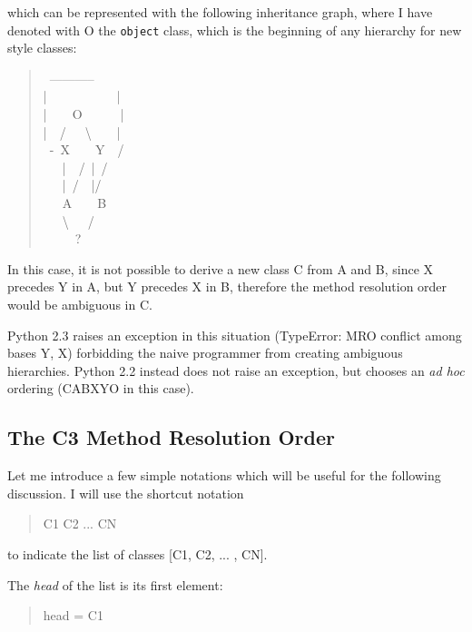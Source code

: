 \documentclass[10pt,english]{article}
\begin{document}
which can be represented with the following inheritance graph, where I
have denoted with O the \texttt{object} class, which is the beginning of any
hierarchy for new style classes:
\begin{quote}
\begin{ttfamily}\begin{flushleft}
\mbox{~-----------}\\
\mbox{|~~~~~~~~~~~|}\\
\mbox{|~~~~O~~~~~~|}\\
\mbox{|~~/~~~{\textbackslash}~~~~|}\\
\mbox{~-~X~~~~Y~~/}\\
\mbox{~~~|~~/~|~/}\\
\mbox{~~~|~/~~|/}\\
\mbox{~~~A~~~~B}\\
\mbox{~~~{\textbackslash}~~~/}\\
\mbox{~~~~~?}
\end{flushleft}\end{ttfamily}
\end{quote}

In this case, it is not possible to derive a new class C from A and B,
since X precedes Y in A, but Y precedes X in B, therefore the method
resolution order would be ambiguous in C.

Python 2.3 raises an exception in this situation (TypeError:  MRO
conflict among bases Y, X) forbidding the naive programmer from creating
ambiguous hierarchies.  Python 2.2 instead does not raise an exception,
but chooses an \emph{ad hoc} ordering (CABXYO in this case).



\hypertarget{the-c3-method-resolution-order}{}
\subsection*{The C3 Method Resolution Order}

Let me introduce a few simple notations which will be useful for the
following discussion.  I will use the shortcut notation
\begin{quote}

C1 C2 ... CN
\end{quote}

to indicate the list of classes [C1, C2, ... , CN].

The \emph{head} of the list is its first element:
\begin{quote}

head = C1
\end{quote}
\end{document}
